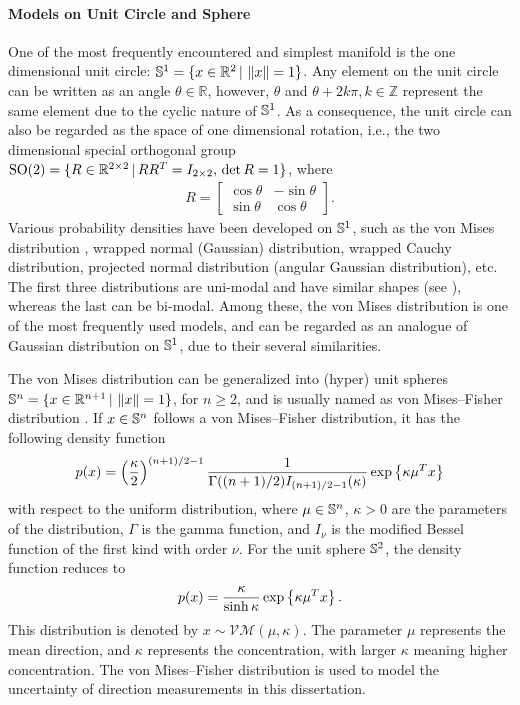 \paragraph{Models on Unit Circle and Sphere}

One of the most frequently encountered and simplest manifold is the one dimensional unit circle: $\mathbb{S}^1 = \{ x\in\mathbb{R}^2 \,|\, \left\| x \right\| = 1 \}$.
Any element on the unit circle can be written as an angle $\theta\in\mathbb{R}$, however, $\theta$ and $\theta+2k\pi, k\in\mathbb{Z}$ represent the same element due to the cyclic nature of $\mathbb{S}^1$.
As a consequence, the unit circle can also be regarded as the space of one dimensional rotation, i.e., the two dimensional special orthogonal group $\mathrm{SO}(2) = \{ R\in\mathbb{R}^{2\times 2} \,|\, RR^T = I_{2\times 2},\, \det R = 1\}$, where
\begin{align*}
	R = \begin{bmatrix}
		\cos\theta & -\sin\theta \\
		\sin\theta & \cos\theta
	\end{bmatrix}.
\end{align*}
Various probability densities have been developed on $\mathbb{S}^1$, such as the von Mises distribution \cite{von1918uber}, wrapped normal (Gaussian) distribution, wrapped Cauchy distribution, projected normal distribution (angular Gaussian distribution), etc.
The first three distributions are uni-modal and have similar shapes (see \cite[Figure 3.3]{mardia2009directional}), whereas the last can be bi-modal.
Among these, the von Mises distribution is one of the most frequently used models, and can be regarded as an analogue of Gaussian distribution on $\mathbb{S}^1$, due to their several similarities.

The von Mises distribution can be generalized into (hyper) unit spheres $\mathbb{S}^n = \{ x\in\mathbb{R}^{n+1} \,|\, \left\| x \right\|=1 \}$, for $n\geq 2$, and is usually named as von Mises--Fisher distribution \cite{fisher1953dispersion}.
If $x\in\mathbb{S}^n$ follows a von Mises--Fisher distribution, it has the following density function
\begin{align*}
	p(x) = \left(\frac{\kappa}{2}\right)^{(n+1)/2-1} \frac{1}{\Gamma((n+1)/2) I_{(n+1)/2-1}(\kappa)} \exp\left\{ \kappa\mu^T x \right\}
\end{align*}
with respect to the uniform distribution, where $\mu\in\mathbb{S}^n$, $\kappa>0$ are the parameters of the distribution, $\Gamma$ is the gamma function, and $I_\nu$ is the modified Bessel function of the first kind with order $\nu$.
For the unit sphere $\mathbb{S}^2$, the density function reduces to
\begin{align}
	p(x) = \frac{\kappa}{\sinh\kappa} \exp\left\{ \kappa\mu^T x \right\}.
\end{align}
This distribution is denoted by $x\sim \mathcal{VM}(\mu,\kappa)$.
The parameter $\mu$ represents the mean direction, and $\kappa$ represents the concentration, with larger $\kappa$ meaning higher concentration.
The von Mises--Fisher distribution is used to model the uncertainty of direction measurements in this dissertation.

